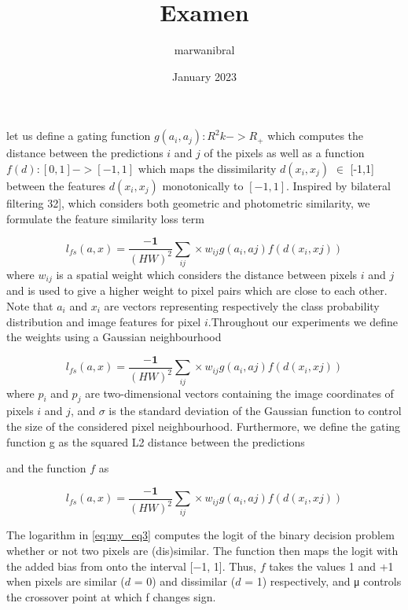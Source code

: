 \documentclass[10pt,twocolumn,letterpaper]{article}
\title{Examen}
\author{marwanibral }
\date{January 2023}
\begin{document}
\maketitle


\maketitle
let us define a gating function $g({a}_{i},{a}_{j}) : {R^2k} -> R_{+}$ which computes the distance between the predictions ${i}$ and ${j}$ of the pixels as well as a function $f(d) : [0,1] -> [-1,1]$ which maps the dissimilarity $d(x_{i}, x_{j})$ $\in$ [-1,1] between the
features $d(x_{i}, x_{j})$ monotonically to $[−1,1]$. Inspired by bilateral filtering\cite{bilareral filtering} 32], which considers both geometric and
photometric similarity, we formulate the feature similarity
loss term

\begin{equation}
    l_{fs}(a,x) = \frac{-\mathbf{1}}{(HW)^2} \sum_{ij}  \times w_{ij}g(a_{i}, a{j}) f(d(x_{i}, x{j}))  
    \label{eq:my_eq1}
\end{equation}
where $w_{ij}$ is a spatial weight which considers the distance
between pixels $i$ and $j$ and is used to give a higher weight
to pixel pairs which are close to each other. Note that $a_{i}$ and $x_{i}$ are vectors representing respectively the class probability
distribution and image features for pixel $i$.Throughout
our experiments we define the weights using a Gaussian
neighbourhood

\begin{equation}
    l_{fs}(a,x) = \frac{-\mathbf{1}}{(HW)^2} \sum_{ij}  \times w_{ij}g(a_{i}, a{j}) f(d(x_{i}, x{j})) 
    \label{eq:my_eq2}
\end{equation}
where $p_{i}$ and $p_{j}$ are two-dimensional vectors containing the
image coordinates of pixels $i$ and $j$, and $σ$ is the standard
deviation of the Gaussian function to control the size of the
considered pixel neighbourhood. Furthermore, we define
the gating function g as the squared L2 distance between the predictions


 and the function $f$ as 

\begin{equation}
    l_{fs}(a,x) = \frac{-\mathbf{1}}{(HW)^2} \sum_{ij}  \times w_{ij}g(a_{i}, a{j}) f(d(x_{i}, x{j}))  
    \label{eq:my_eq3}
\end{equation}

The logarithm in  \cref{eq:my_eq3} computes
the logit of the binary decision problem whether or not two
pixels are (dis)similar. The \tanh function then maps the logit
with the added bias from  onto the interval [−1, 1]. Thus, $f$
takes the values \text{-}1 and +1 when pixels are similar ($d$ = 0)
and dissimilar ($d$ = 1) respectively, and μ controls the crossover
point at which f changes sign.
\end{document}
